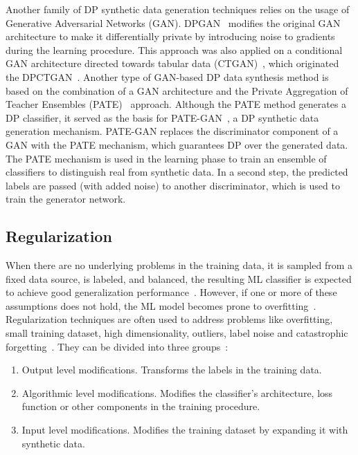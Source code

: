 \documentclass[parskip=full]{scrartcl}
\begin{document}
Another family of DP synthetic data generation techniques relies on the usage
of Generative Adversarial Networks (GAN). DPGAN~\cite{xie2018differentially}
modifies the original GAN architecture to make it differentially private by
introducing noise to gradients during the learning procedure. This approach
was also applied on a conditional GAN architecture directed towards tabular
data (CTGAN)~\cite{xu2019modeling}, which originated the
DPCTGAN~\cite{rosenblatt2020differentially}. Another type of GAN-based DP data
synthesis method is based on the combination of a GAN architecture and the
Private Aggregation of Teacher Ensembles (PATE)~\cite{papernot2017semi}
approach. Although the PATE method generates a DP classifier, it served as the
basis for PATE-GAN~\cite{jordon2018pate}, a DP synthetic data generation
mechanism. PATE-GAN replaces the discriminator component of a GAN with the
PATE mechanism, which guarantees DP over the generated data. The PATE
mechanism is used in the learning phase to train an ensemble of classifiers to
distinguish real from synthetic data. In a second step, the predicted labels
are passed (with added noise) to another discriminator, which is used to train
the generator network.

\subsection{Regularization}\label{sec:regularization}

When there are no underlying problems in the training data, it is sampled from
a fixed data source, is labeled, and balanced, the resulting ML classifier is
expected to achieve good generalization performance~\cite{benning2018modern}.
However, if one or more of these assumptions does not hold, the ML model
becomes prone to overfitting~\cite{Bartlett2021}.  Regularization techniques
are often used to address problems like overfitting, small training dataset,
high dimensionality, outliers, label noise and catastrophic
forgetting~\cite{Halevy2009, Domingos2012, Salman2019, Xie2021}.  They can be
divided into three groups~\cite{santos2022avoiding}:

\begin{enumerate}
    \item Output level modifications. Transforms the labels in the training
        data.
    \item Algorithmic level modifications. Modifies the classifier's
        architecture, loss function or other components in the training
        procedure.
    \item Input level modifications. Modifies the training dataset by
        expanding it with synthetic data.
\end{enumerate}
\end{document}
